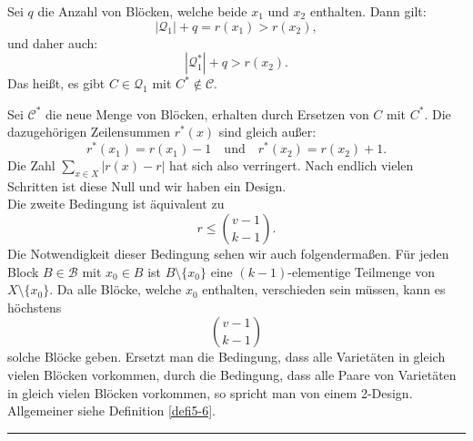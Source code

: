 \documentclass[9pt]{article}
\begin{document}
\begin{satz}
Sei $q$ die Anzahl von Blöcken, welche beide $x_1$ und $x_2$ enthalten. Dann gilt:
\[
|\mathcal{Q}_1| + q = r(x_1) > r(x_2),
\]
und daher auch:
\[ 
|\mathcal{Q}_1^*| + q > r(x_2).
\]
Das heißt, es gibt $C \in \mathcal{Q}_1$ mit $C^* \notin \mathcal{C}$.  

Sei $\mathcal{C}^*$ die neue Menge von Blöcken, erhalten durch Ersetzen von $C$ mit $C^*$.  
Die dazugehörigen Zeilensummen $r^*(x)$ sind gleich außer:
\[
r^*(x_1) = r(x_1) - 1 \quad \text{und} \quad r^*(x_2) = r(x_2) + 1.
\]
Die Zahl $\sum_{x \in X} |r(x) - r|$ hat sich also verringert.  
Nach endlich vielen Schritten ist diese Null und wir haben ein Design. \\ \newline
Die zweite Bedingung ist äquivalent zu 
\[
 r \leq \binom{v-1}{k-1}.
\] 
Die Notwendigkeit dieser Bedingung sehen wir auch folgendermaßen. Für jeden Block \( B \in \mathcal{B} \)
mit \( x_0 \in B \) ist \( B \setminus \{x_0\} \) eine \((k - 1)\)-elementige Teilmenge von \( X \setminus \{x_0\} \).
Da alle Blöcke, welche \( x_0 \) enthalten, verschieden sein müssen, kann es höchstens 
\[
\binom{v-1}{k-1}
\]
solche Blöcke geben.
\explainvkrb
Ersetzt man die Bedingung, dass alle Varietäten in gleich vielen Blöcken
vorkommen, durch die Bedingung, dass alle Paare von Varietäten in gleich
vielen Blöcken vorkommen, so spricht man von einem 2-Design. Allgemeiner siehe Definition \ref{defi5-6}.
 \end{satz} \noindent \rule{8cm}{0.4pt}
\end{document}
